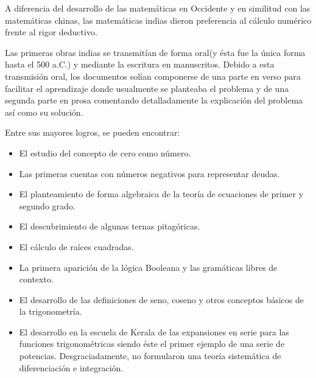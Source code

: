 \documentclass[a4paper, 11pt]{article}
\begin{document}
	A diferencia del desarrollo de las matemáticas en Occidente y en similitud con las matemáticas chinas, las matemáticas
	indias dieron preferencia al cálculo numérico frente al rigor deductivo.

	Las primeras obras indias se transmitían de forma oral(y ésta fue la única forma hasta el 500 a.C.) y mediante la
	escritura en manuscritos. Debido a esta transmisión oral, los documentos solían componerse de una parte en verso
	para facilitar el aprendizaje donde usualmente se planteaba el problema y de una segunda parte en prosa comentando
	detalladamente la explicación del problema así como su solución.
	
	Entre sus mayores logros, se pueden encontrar:
	\begin{itemize}
		\item El estudio del concepto de cero como número.
		\item Las primeras cuentas con números negativos para representar deudas.
		\item El planteamiento de forma algebraica de la teoría de ecuaciones de primer y segundo grado.
		\item El descubrimiento de algunas ternas pitagóricas.
		\item El cálculo de raíces cuadradas.
		\item La primera aparición de la lógica Booleana y las gramáticas libres de contexto.
		\item El desarrollo de las definiciones de seno, coseno y otros conceptos básicos de la trigonometría.
		\item El desarrollo en la escuela de Kerala de las expansiones en serie para las funciones trigonométricas siendo
		éste el primer ejemplo de una serie de potencias. Desgraciadamente, no formularon una teoría sistemática de
		diferenciación e integración.
	\end{itemize}
\end{document}
